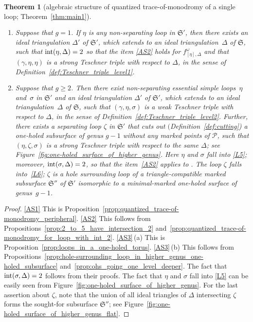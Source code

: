 \documentclass[pdftex]{sigma}
\numberwithin{equation}{section}
\newtheorem{Theorem}{Theorem}[section]
\theoremstyle{definition}
\begin{document}
\begin{Theorem}[algebraic structure of quantized trace-of-monodromy of a single loop; Theorem~\ref{thm:main1}]
\begin{enumerate}[label={\rm (AS\arabic*)}]
\begin{enumerate}[label={\rm (\alph*)}]
\item Suppose that $g=1$. If $\eta$ is any non-separating loop in $\mathfrak{S}'$, then there exists an ideal triangulation $\Delta'$ of $\mathfrak{S}'$, which extends to an ideal triangulation~$\Delta$ of $\mathfrak{S}$, such that ${\rm int}(\eta,\Delta)=2$ so that the item \ref{AS2} holds for $f^\omega_{[\eta],\Delta}$ and that $(\gamma,\eta,\eta)$ is a strong Teschner triple with respect to $\Delta$, in the sense of Definition~{\rm \ref{def:Teschner_triple_level1}}.
\item Suppose that $g\ge 2$. Then there exist non-separating essential simple loops~$\eta$ and~$\sigma$ in $\mathfrak{S}'$ and an ideal triangulation $\Delta'$ of $\mathfrak{S}'$, which extends to an ideal triangulation~$\Delta$ of $\mathfrak{S}$, such that $(\gamma,\eta,\sigma)$ is a weak Teschner triple with respect to $\Delta$, in the sense of Definition~{\rm \ref{def:Teschner_triple_level2}}. Further, there exists a separating loop $\zeta$ in $\mathfrak{S}'$ that cuts out $($Definition~{\rm \ref{def:cutting})} a one-holed subsurface of genus $g-1$ without any marked points of $\mathcal{P}$, such that $(\eta,\zeta,\sigma)$ is a strong Teschner triple with respect to the same $\Delta$; see Figure~{\rm \ref{fig:one-holed_surface_of_higher_genus}}. Here $\eta$ and $\sigma$ fall into \ref{L5}; moreover, ${\rm int}(\sigma,\Delta)=2$, so that the item~\ref{AS2} applies to . The loop $\zeta$ falls into~\ref{L6};
$\zeta$ is a hole surrounding loop of a triangle-compatible marked subsurface $\mathfrak{S}''$ of $\mathfrak{S}'$ isomorphic to a minimal-marked one-holed surface of genus~$g-1$.
\end{enumerate}
\end{enumerate}
\end{Theorem}
\begin{proof} \ref{AS1} This is Proposition~\ref{prop:quantized_trace-of-monodromy_peripheral}.
\ref{AS2} This follows from Propositions~\ref{prop:2_to_5_have_intersection_2} and~\ref{prop:quantized_trace-of-monodromy_for_loop_with_int_2}.
\ref{AS3}\,{\rm (a)} This is Proposition~\ref{prop:loops_in_a_one-holed_torus}.
\ref{AS3}\,{\rm (b)} This follows from Propositions~\ref{prop:hole-surrounding_loop_in_higher_genus_one-holed_subsurface} and~\ref{prop:ohs_going_one_level_deeper}. The fact that ${\rm int}(\sigma,\Delta)=2$ follows from their proofs. The fact that $\eta$ and $\sigma$ fall into \ref{L5} can be easily seen from Figure~\ref{fig:one-holed_surface_of_higher_genus}. For the last assertion about $\zeta$, note that the union of all ideal triangles of $\Delta$ intersecting $\zeta$ forms the sought-for subsurface $\mathfrak{S}''$; see Figure~\ref{fig:one-holed_surface_of_higher_genus_flat}.
\end{proof}
\end{document}
